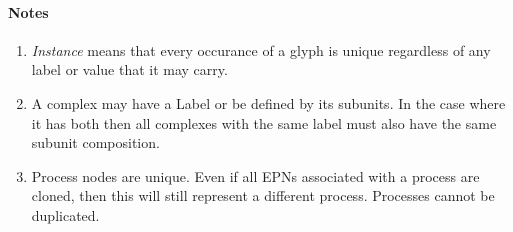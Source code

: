 \paragraph*{Notes}

\begin{enumerate}
\item \emph{Instance} means that every occurance of a glyph is unique
  regardless of any label or value that it may carry.
\item A complex may have a Label or be defined by its subunits. In the case where it has both then all complexes with the same label must also have the same subunit composition.
\item  Process nodes are unique. Even if all EPNs associated with a
  process are cloned, then this will still represent a different
  process. Processes cannot be duplicated.
\end{enumerate}





